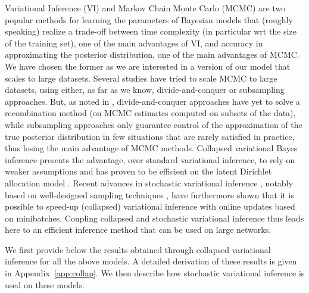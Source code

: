 Variational Inference (VI) and Markov Chain Monte Carlo (MCMC) are two popular methods for learning the parameters of Bayesian models that (roughly speaking) realize a trade-off between time complexity (in particular wrt the size of the training set), one of the main advantages of VI, and accuracy in approximating the posterior distribution, one of the main advantages of MCMC. We have chosen the former as we are interested in a version of our model that scales to large datasets. Several studies have tried to scale MCMC to large datasets, using either, as far as we know, divide-and-conquer or subsampling approaches. But, as noted in \cite{Bardenet2017}, divide-and-conquer approaches have yet to solve a recombination method (on MCMC estimates computed on subsets of the data), while subsampling approaches only guarantee control of the approximation of the true posterior distribution in few situations that are rarely satisfied in practice, thus losing the main advantage of MCMC methods.
Collapsed variational Bayes inference presents the advantage, over standard variational inference, to rely on weaker assumptions and has proven to be efficient on the latent Dirichlet allocation model \cite{teh2007collapsed}. Recent advances in stochastic variational inference \cite{hoffman2013stochastic}, notably based on well-designed sampling techniques \cite{gopalan2013efficient,kim2013efficient}, have furthermore shown that it is possible to speed-up (collapsed) variational inference with online updates based on minibatches.
Coupling collapsed and stochastic variational inference thus leads here to an efficient inference method that can be used on large networks.

We first provide below the results obtained through collapsed variational inference for all the above models. A detailed derivation of these results is given in Appendix~\ref{app:collap}. We then describe how stochastic variational inference is used on these models.

